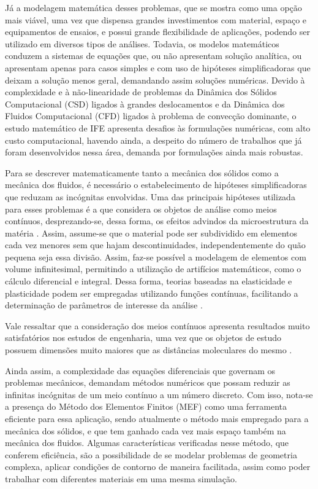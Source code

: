 Já a modelagem matemática desses problemas, que se mostra como uma opção mais viável, uma vez que dispensa grandes investimentos com material, espaço e equipamentos de ensaios, e possui grande flexibilidade de aplicações, podendo ser utilizado em diversos tipos de análises. Todavia, os modelos matemáticos conduzem a sistemas de equações que, ou não apresentam solução analítica, ou apresentam apenas para casos simples e com uso de hipóteses simplificadoras que deixam a solução menos geral, demandando assim soluções numéricas. Devido à complexidade e à não-linearidade de problemas da Dinâmica dos Sólidos Computacional (CSD) ligados à grandes deslocamentos e da Dinâmica dos Fluidos Computacional (CFD) ligados à problema de convecção dominante, o estudo matemático de IFE apresenta desafios às formulações numéricas, com alto custo computacional, havendo ainda, a despeito do número de trabalhos que já foram desenvolvidos nessa área, demanda por formulações ainda mais robustas.

Para se descrever matematicamente tanto a mecânica dos sólidos como a mecânica dos fluidos, é necessário o estabelecimento de hipóteses simplificadoras que reduzam as incógnitas envolvidas. Uma das principais hipóteses utilizada para esses problemas é a que considera os objetos de análise como meios contínuos, desprezando-se, dessa forma, os efeitos advindos da microestrutura da matéria \cite{lai2009introduction, mase2009continuum}. Assim, assume-se que o material pode ser subdividido em elementos cada vez menores sem que hajam descontinuidades, independentemente do quão pequena seja essa divisão. Assim, faz-se possível a modelagem de elementos com volume infinitesimal, permitindo a utilização de artifícios matemáticos, como o cálculo diferencial e integral. Dessa forma, teorias baseadas na elasticidade e plasticidade podem ser empregadas utilizando funções contínuas, facilitando a determinação de parâmetros de interesse da análise \cite{irgens2008continuum, lai2009introduction, malvern1969introduction}.

Vale ressaltar que a consideração dos meios contínuos apresenta resultados muito satisfatórios nos estudos de engenharia, uma vez que os objetos de estudo possuem dimensões muito maiores que as distâncias moleculares do mesmo \cite{malvern1969introduction, mase2009continuum}.

Ainda assim, a complexidade das equações diferenciais que governam os problemas mecânicos, demandam métodos numéricos que possam reduzir as infinitas incógnitas de um meio contínuo a um número discreto. Com isso, nota-se a presença do Método dos Elementos Finitos (MEF) como uma ferramenta eficiente para essa aplicação, sendo atualmente o método mais empregado para a mecânica dos sólidos, e que tem ganhado cada vez mais espaço também na mecânica dos fluidos. Algumas características verificadas nesse método, que conferem eficiência, são a possibilidade de se modelar problemas de geometria complexa, aplicar condições de contorno de maneira facilitada, assim como poder trabalhar com diferentes materiais em uma mesma simulação.

